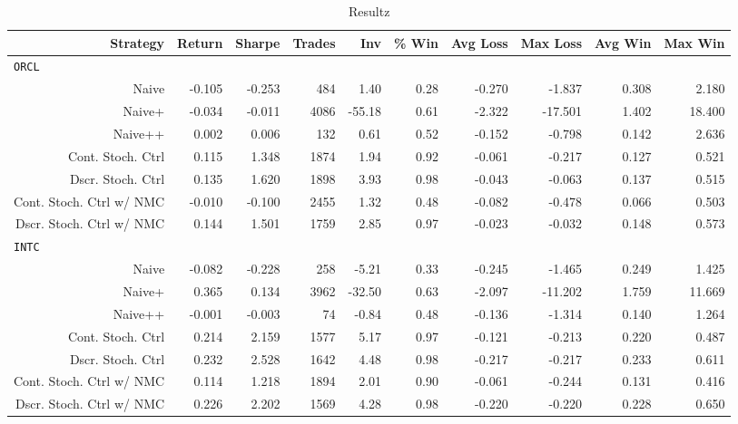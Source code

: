 \begin{sidewaystable}
\centering
{}
\begin{tabular}{@{} *{10}{r} @{}}
\toprule
Strategy & Return & Sharpe & Trades & Inv & \% Win & Avg Loss & Max Loss & Avg Win & Max Win \\
\midrule
\multicolumn{10}{l}{\texttt{ORCL}} \\
Naive & -0.105 & -0.253 & 484 & 1.40 & 0.28 & -0.270 & -1.837 & 0.308 & 2.180 \\ 
Naive+ & -0.034 & -0.011 & 4086 & -55.18 & 0.61 & -2.322 & -17.501 & 1.402 & 18.400 \\ 
Naive++ & 0.002 & 0.006 & 132 & 0.61 & 0.52 & -0.152 & -0.798 & 0.142 & 2.636 \\ 
Cont. Stoch. Ctrl & 0.115 & 1.348 & 1874 & 1.94 & 0.92 & -0.061 & -0.217 & 0.127 & 0.521 \\ 
Dscr. Stoch. Ctrl & 0.135 & 1.620 & 1898 & 3.93 & 0.98 & -0.043 & -0.063 & 0.137 & 0.515 \\ 
Cont. Stoch. Ctrl w/ NMC & -0.010 & -0.100 & 2455 & 1.32 & 0.48 & -0.082 & -0.478 & 0.066 & 0.503 \\ 
Dscr. Stoch. Ctrl w/ NMC & 0.144 & 1.501 & 1759 & 2.85 & 0.97 & -0.023 & -0.032 & 0.148 & 0.573 \\[2ex]
\multicolumn{10}{l}{\texttt{INTC}} \\
Naive & -0.082 & -0.228 & 258 & -5.21 & 0.33 & -0.245 & -1.465 & 0.249 & 1.425 \\ 
Naive+ & 0.365 & 0.134 & 3962 & -32.50 & 0.63 & -2.097 & -11.202 & 1.759 & 11.669 \\ 
Naive++ & -0.001 & -0.003 & 74 & -0.84 & 0.48 & -0.136 & -1.314 & 0.140 & 1.264 \\ 
Cont. Stoch. Ctrl & 0.214 & 2.159 & 1577 & 5.17 & 0.97 & -0.121 & -0.213 & 0.220 & 0.487 \\ 
Dscr. Stoch. Ctrl & 0.232 & 2.528 & 1642 & 4.48 & 0.98 & -0.217 & -0.217 & 0.233 & 0.611 \\ 
Cont. Stoch. Ctrl w/ NMC & 0.114 & 1.218 & 1894 & 2.01 & 0.90 & -0.061 & -0.244 & 0.131 & 0.416 \\ 
Dscr. Stoch. Ctrl w/ NMC &  0.226 & 2.202 & 1569 & 4.28 & 0.98 & -0.220 & -0.220 & 0.228 & 0.650 \\ 
\bottomrule
\end{tabular}
\caption{Resultz}
\label{tbl:insampleORCLINTC}
\end{sidewaystable}



